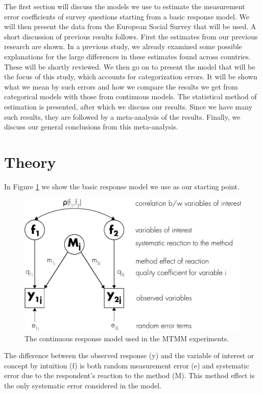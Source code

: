 \documentclass[a4paper,12pt]{article}
\begin{document}
The first section will discuss the models we use to estimate the measurement error coefficients of survey questions starting from a basic response model. We will then present the data from the European Social Survey that will be used. A short discussion of previous results follows. First the estimates from our previous research are shown. In a previous study, we already examined some possible explanations for the large differences in these estimates found across countries. These will be shortly reviewed. We then go on to present the model that will be the focus of this study, which accounts for categorization errors. It will be shown what we mean by such errors and how we compare the results we get from categorical models with those from continuous models. The statistical method of estimation is presented, after which we discuss our results. Since we have many such results, they are followed by a meta-analysis of the results. Finally, we discuss our general conclusions from this meta-analysis.


\section{Theory}

In Figure \ref{fig:response} we show the basic response model \citep{Saris_design_2007} we use as our starting point. 

\begin{figure}[htb]
\centering
\includegraphics[width=.7\textwidth]{i/response_model_continuous}
\caption{The continuous response model used in the MTMM experiments.\label{fig:response}}
\end{figure}

The difference between the observed response (y) and the variable of interest or concept by intuition (f) is both random measurement error (e) and systematic error due to the respondent's reaction to the method (M). This method effect is the only systematic error considered in the model.
\end{document}
